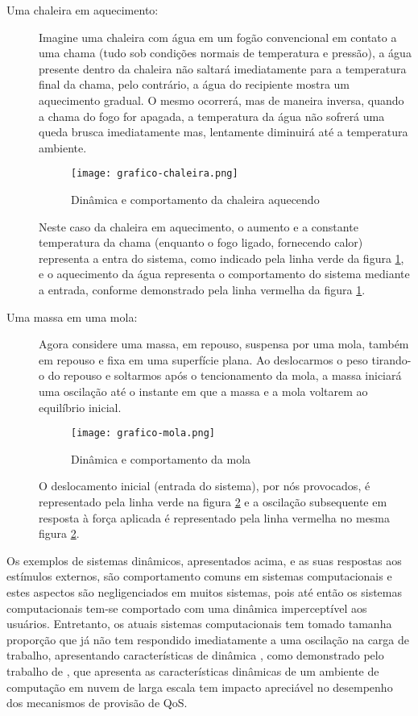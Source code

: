 \begin{description}
	\item[Uma chaleira em aquecimento:] Imagine uma chaleira com água em um fogão convencional em contato a uma chama (tudo sob condições normais de temperatura e pressão), a água presente dentro da chaleira não saltará imediatamente para a temperatura final da chama, pelo contrário, a água do recipiente mostra um aquecimento gradual. O mesmo ocorrerá, mas de maneira inversa, quando a chama do fogo for apagada, a temperatura da água não sofrerá uma queda brusca imediatamente mas, lentamente diminuirá até a temperatura ambiente.
	
	\begin{figure}[htb]
		\centering
		\texttt{[image: grafico-chaleira.png]}
		\caption{Dinâmica e comportamento da chaleira aquecendo}
		\label{fig:chaleira}
	\end{figure}
	
	Neste caso da chaleira em aquecimento, o aumento e a constante temperatura da chama (enquanto o fogo ligado, fornecendo calor) representa a entra do sistema, como indicado pela linha verde da figura \ref{fig:chaleira}, e o aquecimento da água representa o comportamento do sistema mediante a entrada, conforme demonstrado pela linha vermelha da figura \ref{fig:chaleira}. 
	
	\item[Uma massa em uma mola:] Agora considere uma massa, em repouso, suspensa por uma mola, também em repouso e fixa em uma superfície plana. Ao deslocarmos o peso tirando-o do repouso e soltarmos após o tencionamento da mola, a massa iniciará uma oscilação até o instante em que a massa e a mola voltarem ao equilíbrio inicial.	
	
	\begin{figure}[!htb]
		\centering
		\texttt{[image: grafico-mola.png]}
		\caption{Dinâmica e comportamento da mola}
		\label{fig:mola}		
	\end{figure}
	
	O deslocamento inicial (entrada do sistema), por nós provocados, é representado pela linha verde na figura \ref{fig:mola} e a oscilação subsequente em resposta à força aplicada é representado pela linha vermelha no mesma figura \ref{fig:mola}.
\end{description}

Os exemplos de sistemas dinâmicos, apresentados acima, e as suas respostas aos estímulos externos, são comportamento comuns em sistemas computacionais e estes aspectos são negligenciados em muitos sistemas, pois até então os sistemas computacionais tem-se comportado com uma dinâmica imperceptível aos usuários. Entretanto, os atuais sistemas computacionais tem tomado tamanha proporção que já não tem respondido imediatamente a uma oscilação na carga de trabalho, apresentando características de dinâmica \cite{Janert2013}, como demonstrado pelo trabalho de , que apresenta as características dinâmicas de um ambiente de computação em nuvem de larga escala tem impacto apreciável no desempenho dos mecanismos de provisão de QoS.


